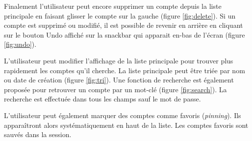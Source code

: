 \begin{center}
	\begin{minipage}{.3\textwidth}
	\end{minipage}
	\begin{minipage}{.3\textwidth}
	\end{minipage}        
\end{center}

Finalement l'utilisateur peut encore supprimer un compte depuis la liste principale en faisant glisser le compte sur la gauche (figure \ref{fig:delete}). Si un compte est supprimé ou modifié, il est possible de revenir en arrière en cliquant sur le bouton Undo affiché sur la snackbar qui apparait en-bas de l'écran (figure \ref{fig:undo}).

\begin{center}
	\begin{minipage}{.3\textwidth}
	\end{minipage}
	\begin{minipage}{.3\textwidth}
	\end{minipage}        
\end{center}

L'utilisateur peut modifier l'affichage de la liste principale pour trouver plus rapidement les comptes qu'il cherche. La liste principale peut être triée par nom ou date de création (figure \ref{fig:tri}). Une fonction de recherche est également proposée pour retrouver un compte par un mot-clé (figure \ref{fig:search}). La recherche est effectuée dans tous les champs sauf le mot de passe. 

L'utilisateur peut également marquer des comptes comme favoris (\emph{pinning}). Ils apparaîtront alors systématiquement en haut de la liste. Les comptes favoris sont sauvés dans la session.

\begin{center}
	\begin{minipage}{.3\textwidth}
	\end{minipage}
	\begin{minipage}{.3\textwidth}
	\end{minipage}
\end{center}

